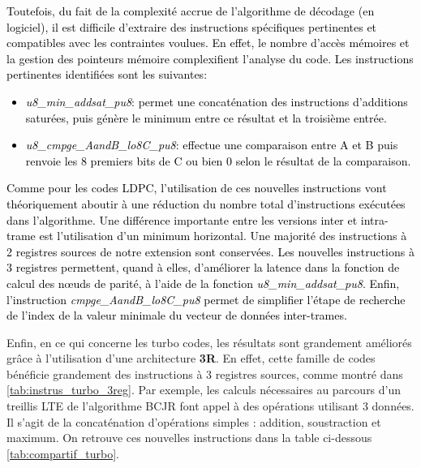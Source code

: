 \documentclass[../main.tex]{subfiles}
\begin{document}
\textcolor{black}{Toutefois, du fait de la complexité accrue de l'algorithme de décodage (en logiciel), il est difficile d'extraire des instructions spécifiques pertinentes et compatibles avec les contraintes voulues. 
En effet, le nombre d'accès mémoires et la gestion des pointeurs mémoire complexifient l'analyse du code.
Les instructions pertinentes identifiées sont les suivantes: 
\begin{itemize}
    \item \textit{u8\_min\_addsat\_pu8}: permet une concaténation des instructions d'additions saturées, puis génère le minimum entre ce résultat et la troisième entrée.
    \item \textit{u8\_cmpge\_AandB\_lo8C\_pu8}: effectue une comparaison entre A et B puis renvoie les 8 premiers bits de C ou bien 0 selon le résultat de la comparaison. 
\end{itemize}
Comme pour les codes LDPC, l'utilisation de ces nouvelles instructions vont théoriquement aboutir à une réduction du nombre total d'instructions exécutées dans l'algorithme.
Une différence importante entre les versions inter et intra-trame est l'utilisation d'un minimum horizontal.
Une majorité des instructions à 2 registres sources de notre extension sont conservées.
Les nouvelles instructions à 3 registres permettent, quand à elles, d'améliorer la latence dans la fonction de calcul des nœuds de parité, à l'aide de la fonction \textit{u8\_min\_addsat\_pu8}.
Enfin, l'instruction \textit{cmpge\_AandB\_lo8C\_pu8} permet de simplifier l'étape de recherche de l'index de la valeur minimale du vecteur de données inter-trames.\\ }



Enfin, en ce qui concerne les turbo codes, les résultats sont grandement améliorés grâce à l'utilisation d'une architecture \textbf{3R}.
En effet, cette famille de codes bénéficie grandement des instructions à 3 registres sources, comme montré dans \ref{tab:instrus_turbo_3reg}.
Par exemple, les calculs nécessaires au parcours d'un treillis LTE de l'algorithme BCJR font appel à des opérations utilisant 3 données.
Il s'agit de la concaténation d'opérations simples : addition, soustraction et maximum.
On retrouve ces nouvelles instructions dans la table ci-dessous \ref{tab:compartif_turbo}.
\end{document}
